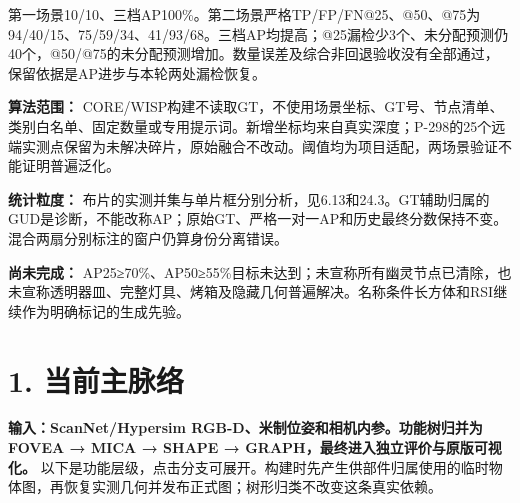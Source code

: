 \documentclass[UTF8,fontset=fandol]{ctexart}
\begin{document}
第一场景10/10、三档AP100\%。第二场景严格TP/FP/FN@25、@50、@75为94/40/15、75/59/34、41/93/68。三档AP均提高；@25漏检少3个、未分配预测仍40个，@50/@75的未分配预测增加。数量误差及综合非回退验收没有全部通过，保留依据是AP进步与本轮两处漏检恢复。



\textbf{算法范围：} CORE/WISP构建不读取GT，不使用场景坐标、GT号、节点清单、类别白名单、固定数量或专用提示词。新增坐标均来自真实深度；P-298的25个远端实测点保留为未解决碎片，原始融合不改动。阈值均为项目适配，两场景验证不能证明普遍泛化。



\textbf{统计粒度：} 布片的实测并集与单片框分别分析，见6.13和24.3。GT辅助归属的GUD是诊断，不能改称AP；原始GT、严格一对一AP和历史最终分数保持不变。混合两扇分别标注的窗户仍算身份分离错误。



\textbf{尚未完成：} AP25≥70\%、AP50≥55\%目标未达到；未宣称所有幽灵节点已清除，也未宣称透明器皿、完整灯具、烤箱及隐藏几何普遍解决。名称条件长方体和RSI继续作为明确标记的生成先验。



\section*{1. 当前主脉络}

\textbf{输入：ScanNet/Hypersim RGB-D、米制位姿和相机内参。功能树归并为 FOVEA → MICA → SHAPE → GRAPH，最终进入独立评价与原版可视化。} 以下是功能层级，点击分支可展开。构建时先产生供部件归属使用的临时物体图，再恢复实测几何并发布正式图；树形归类不改变这条真实依赖。
\end{document}
